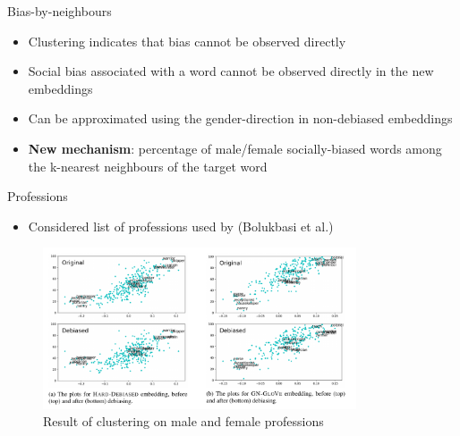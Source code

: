 \documentclass{beamer}
\begin{document}
	\begin{frame}{Bias-by-neighbours}
		\begin{itemize}
			\item Clustering indicates that bias cannot be observed directly
			\item Social bias associated with a word cannot be observed directly in the new embeddings
			\item Can be approximated using the gender-direction in non-debiased embeddings
			\item \textbf{New mechanism}: percentage of male/female socially-biased words among the k-nearest neighbours of the target word
			
		\end{itemize}
	\end{frame}

	\begin{frame}{Professions}
		\begin{itemize}
			\item Considered list of professions used by (Bolukbasi et al.)
		\end{itemize}
		\vspace{3mm}
		\begin{figure}[htbp]
			\centerline{\includegraphics[width=25em]{Cluster_Male_Female_Professions.png}}
			\caption{Result of clustering on male and female professions}
			\label{profession-cluster-fig}
		\end{figure}
	\end{frame}
\end{document}
